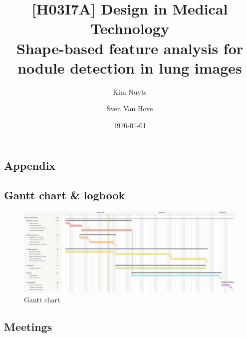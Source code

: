 \documentclass[twoside, 10pt, twoside]{article}
\title
{
	[H03I7A] Design in Medical Technology\\
	Shape-based feature analysis for\\
	nodule detection in lung images
}
\author{Kim Nuyts \and Sven Van Hove}
\date{\today}
\numberwithin{equation}{section}
\begin{document}

\onecolumn
\tableofcontents
\clearpage

\setlength{\parindent}{0pt} %
\setlength{\parskip}{2ex plus 1ex minus 1ex} %


\clearpage
\twocolumn













\clearpage
\onecolumn


\clearpage
\appendix
\begin{landscape}
\section{Appendix}
%

\subsection{Gantt chart \& logbook}
\begin{figure}[htp]
  \includegraphics[width=\linewidth]{appendix/gantt.png}
  \caption{Gantt chart}
  \label{fig:gantt}
\end{figure}


\end{landscape}

\subsection{Meetings}







\end{document}
